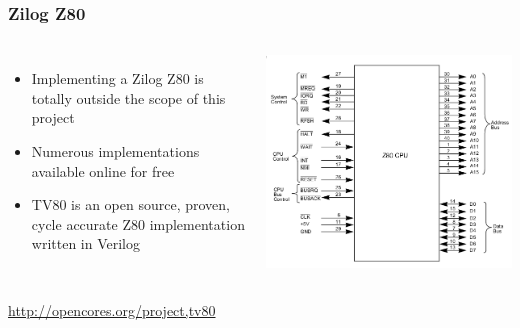 \documentclass{beamer}
\newlength{\wideitemsep}
\let\olditem\item
\renewcommand{\item}{\setlength{\itemsep}{\wideitemsep}\olditem}
\begin{document}
\begin{frame}
    \frametitle{Zilog Z80}

    \begin{columns}[c]
        \begin{itemize}
            \item<1-> Implementing a Zilog Z80 is totally outside the scope of this project
            \item<2-> Numerous implementations available online for free
            \item<3-> TV80 is an open source, proven, cycle accurate Z80 implementation written in Verilog
        \end{itemize}

            \includegraphics[width=\textwidth]{../design/z80.png}
    \end{columns}
    \vspace{0.5cm}
     { \url{http://opencores.org/project,tv80}}

\end{frame}
\end{document}
